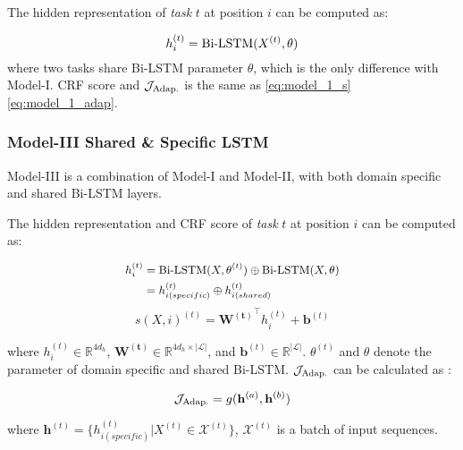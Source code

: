 The hidden representation of \textit{task} $t$ at position $i$ can be 
computed as:

\small
\begin{equation}\label{eq:model_2_h}
h_i^{(t)} = \textnormal{Bi-LSTM}(X^{(t)}, \theta)
\end{equation}
\normalsize
\noindent where two tasks share Bi-LSTM parameter $\theta$, which is the only 
difference with Model-\RN{1}. CRF score and $\mathcal{J}_{\textnormal{Adap.}}$ 
is the same as \eqref{eq:model_1_s}\eqref{eq:model_1_adap}.

\subsubsection{Model-\RN{3} Shared \& Specific LSTM}

Model-\RN{3} is a combination of Model-\RN{1} and Model-\RN{2}, 
with both domain specific and shared Bi-LSTM layers.

The hidden representation and CRF score of \textit{task} $t$ at position 
$i$ can be computed as:

\begin{equation}
\small
\begin{aligned}
h_i^{(t)} &= \textnormal{Bi-LSTM}(X, \theta^{(t)}) \oplus \textnormal{Bi-LSTM}(X, \theta)\\
&= h_{i(specific)}^{(t)} \oplus h_{i(shared)}^{(t)}
\end{aligned}
\end{equation}
\begin{equation}
s(X, i)^{(t)} = \mathbf{W^{(t)}}^\top h_i^{(t)} + \mathbf{b}^{(t)}
\end{equation}

\noindent where $h_i^{(t)} \in \mathbb{R}^{4d_h}$, $\mathbf{W^{(t)}} \in \mathbb{R}^{4d_h \times |\mathcal{L}|}$, and $\mathbf{b}^{(t)} \in \mathbb{R}^{|\mathcal{L}|}$. $\theta^{(t)}$ and $\theta$ denote the parameter of domain specific and shared Bi-LSTM. $\mathcal{J}_{\textnormal{Adap.}}$ can be calculated as :

\begin{equation}
\small
\mathcal{J}_{\textnormal{Adap.}} = g(\mathbf{h}^{(a)}, \mathbf{h}^{(b)})
\end{equation}

\noindent where $\mathbf{h}^{(t)} = \{h_{i(specific)}^{(t)} | X^{(t)} \in \mathcal{X}^{(t)}\}$, $\mathcal{X}^{(t)}$ is a batch of input sequences.

